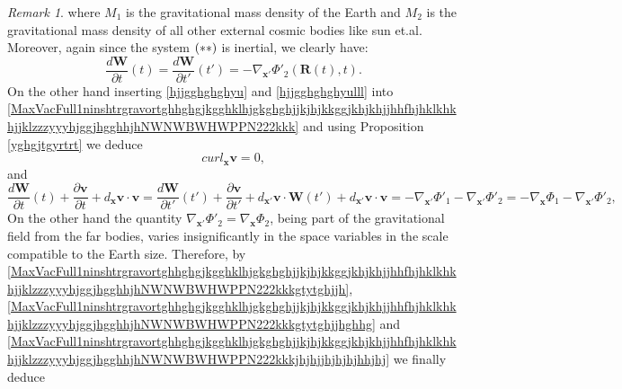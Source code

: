 \documentclass{article}
\theoremstyle{definition}
\theoremstyle{remark}
\newtheorem{remark}{Remark}[section]
\renewcommand{\vec}[1]{\mathbf{#1}}
\newcommand{\er}{\eqref}
\newcommand{\er}{\eqref}
\newtheorem{remark}{Remark}
\begin{document}
\begin{remark}
where $M_1$ is the gravitational mass density of the Earth and $M_2$
is the gravitational mass density of all other external cosmic
bodies like sun et.al. Moreover, again since the system $\bf(**)$ is
inertial, we clearly have:
\begin{equation}
\label{MaxVacFull1ninshtrgravortghhghgjkgghklhjgkghghjjkjhjkkggjkhjkhjjhhfhjhklkhkhjjklzzzyyyhjggjhgghhjhNWNWBWHWPPN222kkkjhjhjjhjhjhjhhjhj}
\frac{d\vec W}{\partial t}(t)=\frac{d\vec W}{\partial
t'}(t')=-\nabla_{\vec x'}\Phi'_2\left(\vec R(t),t\right).
\end{equation}
On the other hand inserting \er{hjjgghghghyu} and
\er{hjjgghghghyulll} into
\er{MaxVacFull1ninshtrgravortghhghgjkgghklhjgkghghjjkjhjkkggjkhjkhjjhhfhjhklkhkhjjklzzzyyyhjggjhgghhjhNWNWBWHWPPN222kkk}
and using Proposition \ref{yghgjtgyrtrt}
we deduce
\begin{equation}
\label{MaxVacFull1ninshtrgravortghhghgjkgghklhjgkghghjjkjhjkkggjkhjkhjjhhfhjhklkhkhjjklzzzyyyhjggjhgghhjhNWNWBWHWPPN222kkkgtytghjjh}
curl_{\vec x}\vec v=0,
\end{equation}
and
\begin{equation}
\label{MaxVacFull1ninshtrgravortghhghgjkgghklhjgkghghjjkjhjkkggjkhjkhjjhhfhjhklkhkhjjklzzzyyyhjggjhgghhjhNWNWBWHWPPN222kkkgtytghjjhghhg}
\frac{d\vec W}{\partial t}(t)+\frac{\partial\vec v}{\partial
t}+d_{\vec x}\vec v\cdot\vec v=\frac{d\vec W}{\partial
t'}(t')+\frac{\partial\vec v}{\partial t'}+d_{\vec x'}\vec
v\cdot\vec W(t')+d_{\vec x'}\vec v\cdot\vec v= -\nabla_{\vec
x'}\Phi'_1-\nabla_{\vec x'}\Phi'_2= -\nabla_{\vec
x}\Phi_1-\nabla_{\vec x'}\Phi'_2,
\end{equation}
On the other hand the quantity $\nabla_{\vec x'}\Phi'_2=\nabla_{\vec
x}\Phi_2$, being part of the gravitational field from the far
bodies, varies insignificantly in the space variables in the scale
compatible to the Earth size. Therefore, by
\er{MaxVacFull1ninshtrgravortghhghgjkgghklhjgkghghjjkjhjkkggjkhjkhjjhhfhjhklkhkhjjklzzzyyyhjggjhgghhjhNWNWBWHWPPN222kkkgtytghjjh},
\er{MaxVacFull1ninshtrgravortghhghgjkgghklhjgkghghjjkjhjkkggjkhjkhjjhhfhjhklkhkhjjklzzzyyyhjggjhgghhjhNWNWBWHWPPN222kkkgtytghjjhghhg}
and
\er{MaxVacFull1ninshtrgravortghhghgjkgghklhjgkghghjjkjhjkkggjkhjkhjjhhfhjhklkhkhjjklzzzyyyhjggjhgghhjhNWNWBWHWPPN222kkkjhjhjjhjhjhjhhjhj}
we finally deduce
\begin{equation}
\label{MaxVacFull1ninshtrgravortghhghgjkgghklhjgkghghjjkjhjkkggjkhjkhjjhhfhjhklkhkhjjklzzzyyyhjggjhgghhjhNWNWBWHWPPN222kkkgtytghjjhpop}

\end{equation}
\end{remark}
\end{document}
